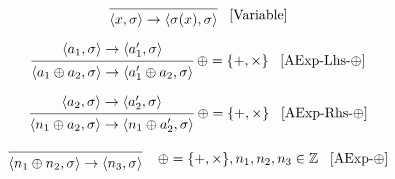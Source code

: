 \[
\begin{prooftree}
\infer0{
	\langle x, \sigma \rangle 
	\rightarrow  
	\langle \sigma(x), \sigma \rangle 
}
\end{prooftree} \; \; \; [\text{Variable}]
\]

\[
\begin{prooftree}
\hypo{
	\langle a_1, \sigma \rangle \rightarrow
	\langle a_1^\prime, \sigma \rangle 
} 
\infer1{
	\langle a_1 \oplus a_2, \sigma \rangle \rightarrow  
	\langle a_1^\prime \oplus a_2, \sigma \rangle
}
\end{prooftree} \; \oplus = \{+,\times\} \; \; \; [\text{AExp-Lhs-}\oplus]
\]

\[
\begin{prooftree}
\hypo{
	\langle a_2, \sigma \rangle \rightarrow
	\langle a_2^\prime, \sigma \rangle 
} 
\infer1{
	\langle n_1 \oplus a_2, \sigma \rangle \rightarrow  
	\langle n_1 \oplus a_2^\prime, \sigma \rangle
}
\end{prooftree} \; \oplus = \{+,\times\} \; \; \; [\text{AExp-Rhs-}\oplus]
\]

\[
\begin{prooftree}
\infer0{
	\langle n_1 \oplus n_2, \sigma \rangle \rightarrow  
	\langle n_3,  \sigma \rangle
}
\end{prooftree} \; \; \; \; \oplus = \{+,\times\}, n_1, n_2, n_3 \in \mathbb{Z} \; \; \; [\text{AExp-}\oplus]
\]

